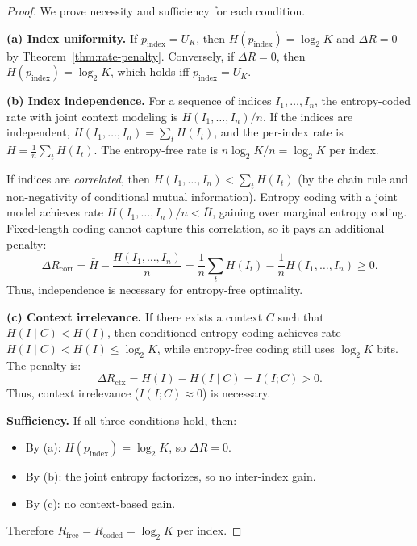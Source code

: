 \documentclass[11pt,a4paper]{article}
\theoremstyle{definition}
\theoremstyle{remark}
\begin{document}
\begin{proof}
We prove necessity and sufficiency for each condition.

\smallskip
\textbf{(a) Index uniformity.}
If $p_{\mathrm{index}} = U_K$, then $H(p_{\mathrm{index}}) = \log_2 K$
and $\Delta R = 0$ by Theorem~\ref{thm:rate-penalty}. Conversely, if
$\Delta R = 0$, then $H(p_{\mathrm{index}}) = \log_2 K$, which holds
iff $p_{\mathrm{index}} = U_K$.

\smallskip
\textbf{(b) Index independence.}
For a sequence of indices $I_1, \ldots, I_n$, the entropy-coded rate with
joint context modeling is $H(I_1, \ldots, I_n) / n$. If the indices are
independent, $H(I_1, \ldots, I_n) = \sum_t H(I_t)$, and the per-index rate
is $\bar{H} = \frac{1}{n}\sum_t H(I_t)$. The entropy-free rate is
$n \log_2 K / n = \log_2 K$ per index.

If indices are \emph{correlated}, then $H(I_1, \ldots, I_n) < \sum_t H(I_t)$
(by the chain rule and non-negativity of conditional mutual information).
Entropy coding with a joint model achieves rate $H(I_1,\ldots,I_n)/n < \bar{H}$,
gaining over marginal entropy coding. Fixed-length coding cannot capture this
correlation, so it pays an additional penalty:
\[
\Delta R_{\mathrm{corr}} = \bar{H} - \frac{H(I_1,\ldots,I_n)}{n}
= \frac{1}{n}\sum_t H(I_t) - \frac{1}{n}H(I_1,\ldots,I_n) \ge 0.
\]
Thus, independence is necessary for entropy-free optimality.

\smallskip
\textbf{(c) Context irrelevance.}
If there exists a context $C$ such that $H(I \mid C) < H(I)$, then
conditioned entropy coding achieves rate $H(I \mid C) < H(I) \le \log_2 K$,
while entropy-free coding still uses $\log_2 K$ bits. The penalty is:
\[
\Delta R_{\mathrm{ctx}} = H(I) - H(I \mid C) = I(I; C) > 0.
\]
Thus, context irrelevance ($I(I; C) \approx 0$) is necessary.

\smallskip
\textbf{Sufficiency.} If all three conditions hold, then:
\begin{itemize}[nosep]
  \item By (a): $H(p_{\mathrm{index}}) = \log_2 K$, so $\Delta R = 0$.
  \item By (b): the joint entropy factorizes, so no inter-index gain.
  \item By (c): no context-based gain.
\end{itemize}
Therefore $R_{\mathrm{free}} = R_{\mathrm{coded}} = \log_2 K$ per index.
\end{proof}
\end{document}
